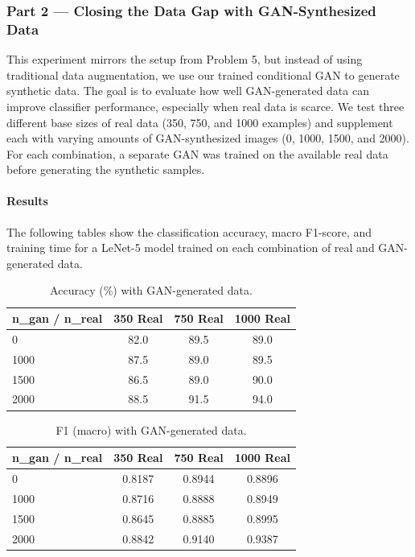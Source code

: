 \subsubsection{Part 2 — Closing the Data Gap with GAN-Synthesized Data}
This experiment mirrors the setup from Problem 5, but instead of using traditional data augmentation, we use our trained conditional GAN to generate synthetic data. The goal is to evaluate how well GAN-generated data can improve classifier performance, especially when real data is scarce. We test three different base sizes of real data (350, 750, and 1000 examples) and supplement each with varying amounts of GAN-synthesized images (0, 1000, 1500, and 2000). For each combination, a separate GAN was trained on the available real data before generating the synthetic samples.

\paragraph{Results}
The following tables show the classification accuracy, macro F1-score, and training time for a LeNet-5 model trained on each combination of real and GAN-generated data.

\begin{table}[H]
	\centering
	\caption{Accuracy (\%) with GAN-generated data.}
	\label{tab:gan_accuracy}
	\begin{tabular}{|l|c|c|c|}
		\hline
		\textbf{n\_gan / n\_real} & \textbf{350 Real} & \textbf{750 Real} & \textbf{1000 Real} \\
		\hline
		0    & 82.0 & 89.5 & 89.0 \\
		1000 & 87.5 & 89.0 & 89.5 \\
		1500 & 86.5 & 89.0 & 90.0 \\
		2000 & 88.5 & 91.5 & 94.0 \\
		\hline
	\end{tabular}
\end{table}

\begin{table}[H]
	\centering
	\caption{F1 (macro) with GAN-generated data.}
	\label{tab:gan_f1}
	\begin{tabular}{|l|c|c|c|}
		\hline
		\textbf{n\_gan / n\_real} & \textbf{350 Real} & \textbf{750 Real} & \textbf{1000 Real} \\
		\hline
		0    & 0.8187 & 0.8944 & 0.8896 \\
		1000 & 0.8716 & 0.8888 & 0.8949 \\
		1500 & 0.8645 & 0.8885 & 0.8995 \\
		2000 & 0.8842 & 0.9140 & 0.9387 \\
		\hline
	\end{tabular}
\end{table}

